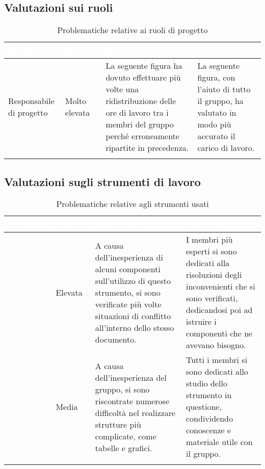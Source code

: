 \subsection{Valutazioni sui ruoli}

\renewcommand{\arraystretch}{1.5}
\centering
\begin{longtable}{C{2.5cm} C{2.5cm} C{6cm} C{5cm}}
\textcolor{white}{\textbf{Problema}} &
\textcolor{white}{\textbf{Gravità}} &
\textcolor{white}{\textbf{Descrizione}} &	
\textcolor{white}{\textbf{Soluzione}} \\	
\endhead

Responsabile di progetto & Molto elevata & 
La seguente figura ha dovuto effettuare più volte una ridistribuzione delle ore di lavoro tra i membri del gruppo perché erroneamente ripartite in precedenza. &
La seguente figura, con l'aiuto di tutto il gruppo, ha valutato in modo più accurato il carico di lavoro. \\

 \caption{Problematiche relative ai ruoli di progetto}
\end{longtable}

\subsection{Valutazioni sugli strumenti di lavoro}

\renewcommand{\arraystretch}{1.5}
\centering
\begin{longtable}{C{2.5cm} C{2.5cm} C{6cm} C{5cm}}
\textcolor{white}{\textbf{Problema}} &
\textcolor{white}{\textbf{Gravità}} &
\textcolor{white}{\textbf{Descrizione}} &	
\textcolor{white}{\textbf{Soluzione}} \\	
\endhead

 & Elevata & 
A causa dell'inesperienza di alcuni componenti sull'utilizzo di questo strumento, si sono verificate più volte situazioni di conflitto all'interno dello stesso documento. &
I membri più esperti si sono dedicati alla risoluzioni degli inconvenienti che si sono verificati, dedicandosi poi ad istruire i componenti che ne avevano bisogno.  \\

 & Media & 
A causa dell'inesperienza del gruppo, si sono riscontrate numerose difficoltà nel realizzare strutture più complicate, come tabelle e grafici. &
Tutti i membri si sono dedicati allo studio dello strumento in questione, condividendo conoscenze e materiale utile con il gruppo.  \\

 \caption{Problematiche relative agli strumenti usati}
\end{longtable}